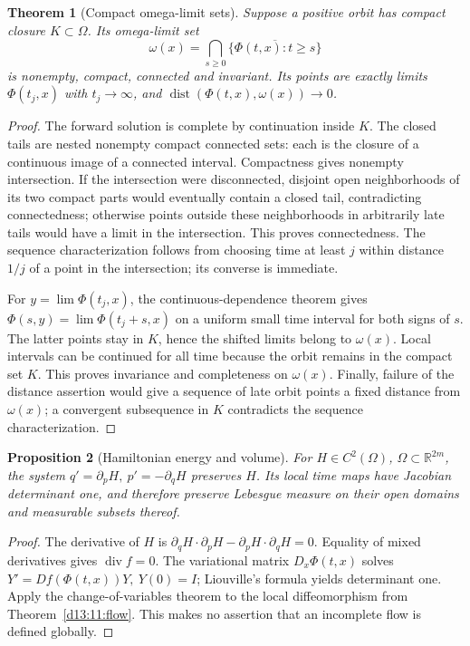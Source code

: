 \documentclass[11pt,oneside]{book}
\newtheorem{theorem}{Theorem}[chapter]
\newtheorem{proposition}[theorem]{Proposition}
\theoremstyle{definition}
\theoremstyle{remark}\newtheorem{remark}[theorem]{Remark}
\newcommand{\R}{\mathbb R}\newcommand{\C}{\mathbb C}
\begin{document}
\begin{theorem}[Compact omega-limit sets]\label{d13:11:omega}
Suppose a positive orbit has compact closure \(K\subset\Omega\).
Its omega-limit set
\[
 \omega(x)=\bigcap_{s\ge0}\overline{\{\Phi(t,x):t\ge s\}}
\]
is nonempty, compact, connected and invariant. Its points are exactly
limits \(\Phi(t_j,x)\) with \(t_j\to\infty\), and
\(\operatorname{dist}(\Phi(t,x),\omega(x))\to0\).
\end{theorem}
\begin{proof}
The forward solution is complete by continuation inside \(K\).
The closed tails are nested nonempty compact connected sets:
each is the closure of a continuous image of a connected interval.
Compactness gives nonempty intersection. If the intersection were
disconnected, disjoint open neighborhoods of its two compact parts
would eventually contain a closed tail, contradicting connectedness;
otherwise points outside these neighborhoods in arbitrarily late
tails would have a limit in the intersection. This proves connectedness.
The sequence characterization follows from choosing time at least \(j\)
within distance \(1/j\) of a point in the intersection; its converse
is immediate.

For \(y=\lim\Phi(t_j,x)\), the continuous-dependence theorem gives
\(\Phi(s,y)=\lim\Phi(t_j+s,x)\) on a uniform small time interval for
both signs of \(s\). The latter points stay in \(K\), hence the shifted
limits belong to \(\omega(x)\). Local intervals can be continued for
all time because the orbit remains in the compact set \(K\).
This proves invariance and completeness on \(\omega(x)\).
Finally, failure of the distance assertion would give a sequence of
late orbit points a fixed distance from \(\omega(x)\); a convergent
subsequence in \(K\) contradicts the sequence characterization.
\end{proof}

\begin{proposition}[Hamiltonian energy and volume]\label{d13:11:hamiltonian}
For \(H\in C^2(\Omega)\), \(\Omega\subset\R^{2m}\), the system
\(q'=\partial_pH,\ p'=-\partial_qH\) preserves \(H\).
Its local time maps have Jacobian determinant one, and therefore
preserve Lebesgue measure on their open domains and measurable subsets
thereof.
\end{proposition}
\begin{proof}
The derivative of \(H\) is
\(\partial_qH\cdot\partial_pH-\partial_pH\cdot\partial_qH=0\).
Equality of mixed derivatives gives \(\operatorname{div}f=0\).
The variational matrix \(D_x\Phi(t,x)\) solves
\(Y'=Df(\Phi(t,x))Y,\ Y(0)=I\); Liouville's formula yields determinant
one. Apply the change-of-variables theorem to the local diffeomorphism
from Theorem~\ref{d13:11:flow}. This makes no assertion that an incomplete
flow is defined globally.
\end{proof}
\end{document}
